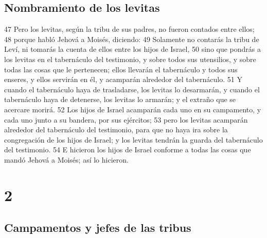 \section*{Nombramiento de los levitas}

47 Pero los levitas, según la tribu de sus padres, no fueron contados entre ellos;
48 porque habló Jehová a Moisés, diciendo:
49 Solamente no contarás la tribu de Leví, ni tomarás la cuenta de ellos entre los hijos de Israel,
50 sino que pondrás a los levitas en el tabernáculo del testimonio, y sobre todos sus utensilios, y sobre todas las cosas que le pertenecen; ellos llevarán el tabernáculo y todos sus enseres, y ellos servirán en él, y acamparán alrededor del tabernáculo.
51 Y cuando el tabernáculo haya de trasladarse, los levitas lo desarmarán, y cuando el tabernáculo haya de detenerse, los levitas lo armarán; y el extraño que se acercare morirá.
52 Los hijos de Israel acamparán cada uno en su campamento, y cada uno junto a su bandera, por sus ejércitos;
53 pero los levitas acamparán alrededor del tabernáculo del testimonio, para que no haya ira sobre la congregación de los hijos de Israel; y los levitas tendrán la guarda del tabernáculo del testimonio.
54 E hicieron los hijos de Israel conforme a todas las cosas que mandó Jehová a Moisés; así lo hicieron.

\chapter{2}

\section*{Campamentos y jefes de las tribus}

